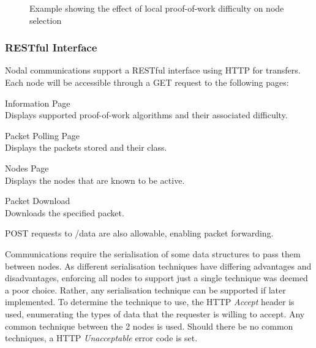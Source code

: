 \begin{figure}[!hbpt]
				
				\caption{Example showing the effect of local proof-of-work difficulty on node selection}
				\label{fig:powmodule}
			\end{figure}
			
		\subsubsection*{RESTful Interface}
			Nodal communications support a RESTful interface using HTTP for transfers. Each node will be accessible through a GET request to the following pages:
			\begin{description}[topsep=-5pt,itemsep=-1ex,partopsep=2ex,parsep=1.5ex]
				\item[/] Information Page \\ Displays supported proof-of-work algorithms and their associated difficulty.
				\item[/poll/\textit{timestamp}] Packet Polling Page \\ Displays the packets stored and their class.
				\item[/nodes] Nodes Page \\ Displays the nodes that are known to be active.
				\item[/data/\textit{packetHash}] Packet Download \\ Downloads the specified packet.
			\end{description}
			
			POST requests to /data are also allowable, enabling packet forwarding.
	
			Communications require the serialisation of some data structures to pass them between nodes. As different serialisation techniques have differing advantages and disadvantages, enforcing all nodes to support just a single technique was deemed a poor choice. Rather, any serialisation technique can be supported if later implemented. To determine the technique to use, the HTTP \textit{Accept} header is used, enumerating the types of data that the requester is willing to accept. Any common technique between the 2 nodes is used. Should there be no common techniques, a HTTP \textit{Unacceptable} error code is set.
			
